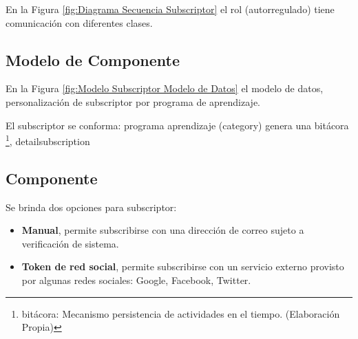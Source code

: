 \begin{minipage}{1.0\textwidth}
	\centering
	\label{fig:Diagrama Clases Subscriptor}
\end{minipage}

En la Figura \ref{fig:Diagrama Secuencia Subscriptor} el rol (autorregulado)
tiene comunicación con diferentes clases. 

\begin{minipage}{1.0\textwidth}
	\centering
	\label{fig:Diagrama Secuencia Subscriptor}
\end{minipage}

\subsection{Modelo de Componente}

En la Figura \ref{fig:Modelo Subscriptor Modelo de Datos} el modelo de datos,
personalización de subscriptor por programa de aprendizaje. 

\begin{minipage}{1.0\textwidth}
	\centering
	\label{fig:Modelo Subscriptor Modelo de Datos}
\end{minipage}

El subscriptor se conforma: programa aprendizaje (category) genera una
bitácora \footnote{bitácora: Mecanismo persistencia de actividades en el
tiempo. (Elaboración Propia)}, detail\textunderscore subscription

\subsection{Componente}

Se brinda dos opciones para subscriptor: 

\begin{itemize}

\item \textbf{Manual}, permite subscribirse con una dirección de
correo sujeto a verificación de sistema.

\item \textbf{Token de red social}, permite subscribirse con un servicio
externo provisto por algunas redes sociales: Google, Facebook, Twitter.

\end{itemize}

